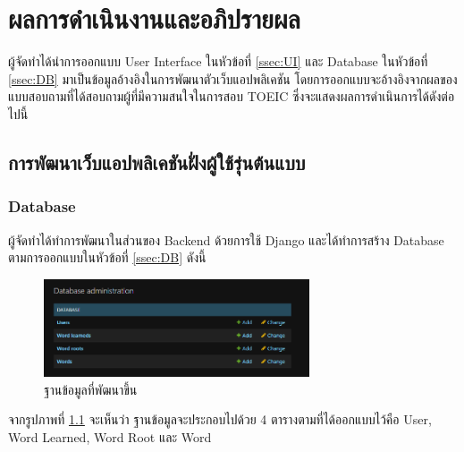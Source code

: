 \documentclass[12pt,oneside,openright,a4paper]{cpe-thai-project}
\begin{document}
\chapter{ผลการดำเนินงานและอภิปรายผล}

\hspace{1cm}
ผู้จัดทำได้นำการออกแบบ User Interface ในหัวข้อที่ \ref{ssec:UI} และ Database ในหัวข้อที่ \ref{ssec:DB}
มาเป็นข้อมูลอ้างอิงในการพัฒนาตัวเว็บแอปพลิเคชัน โดยการออกแบบจะอ้างอิงจากผลของแบบสอบถามที่ได้สอบถามผู้ที่มีความสนใจในการสอบ TOEIC
ซึ่งจะแสดงผลการดำเนินการได้ดังต่อไปนี้

\section{การพัฒนาเว็บแอปพลิเคชันฝั่งผู้ใช้รุ่นต้นแบบ}
\subsection{Database}
\hspace{1cm}
ผู้จัดทำได้ทำการพัฒนาในส่วนของ Backend ด้วยการใช้ Django และได้ทำการสร้าง Database ตามการออกแบบในหัวข้อที่ \ref{ssec:DB}
ดังนี้

\begin{figure}[!h]\centering
	\includegraphics[width=0.7\textwidth, keepaspectratio=true]{image/chap4/DB/db.png}
	\caption{{ฐานข้อมูลที่พัฒนาขึ้น}}\label{fig:chap4DB}
\end{figure}
\hspace{1cm}
จากรูปภาพที่ \ref{fig:chap4DB} จะเห็นว่า ฐานข้อมูลจะประกอบไปด้วย 4 ตารางตามที่ได้ออกแบบไว้คือ User, Word Learned,
Word Root และ Word
\end{document}
